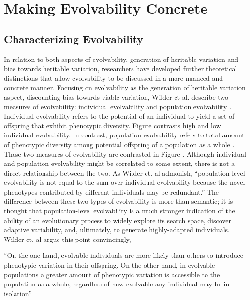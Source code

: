 \chapter{Making Evolvability Concrete} \label{sec:definition}

\section{Characterizing Evolvability} \label{sec:characterizing}

In relation to both aspects of evolvability, generation of heritable variation and bias towards heritable variation, researchers have developed further theoretical distinctions that allow evolvability to be discussed in a more nuanced and concrete manner. Focusing on evolvability as the generation of heritable variation aspect, discounting bias towards viable variation, Wilder et al. describe two measures of evolvability: individual evolvability and population evolvability \cite{Wilder2015ReconcilingEvolvability}. Individual evolvability refers to the potential of an individual to yield a set of offspring that exhibit phenotypic diversity. Figure  contrasts high and low individual evolvability. In contrast, population evolvability refers to total amount of phenotypic diversity among potential offspring of a population as a whole \cite{Wilder2015ReconcilingEvolvability}. These two measures of evolvability are contrasted in Figure . Although individual and population evolvability might be correlated to some extent, there is not a direct relationship between the two. As Wilder et. al admonish, ``population-level evolvability is not equal to the sum over individual evolvability because the novel phenotypes contributed by different individuals may be redundant.'' \cite{Wilder2015ReconcilingEvolvability} The difference between these two types of evolvability is more than semantic; it is thought that population-level evolvability is a much stronger indication of the ability of an evolutionary process to widely explore its search space, discover adaptive variability, and, ultimately, to generate highly-adapted individuals. Wilder et. al argue this point convincingly,
\begin{displayquote}
``On the one hand, evolvable individuals are more likely than others to introduce phenotypic variation in their offspring. On the other hand, in evolvable populations a greater amount of phenotypic variation is accessible to the population as a whole, regardless of how evolvable any individual may be in isolation'' \cite{Wilder2015ReconcilingEvolvability}
\end{displayquote}
